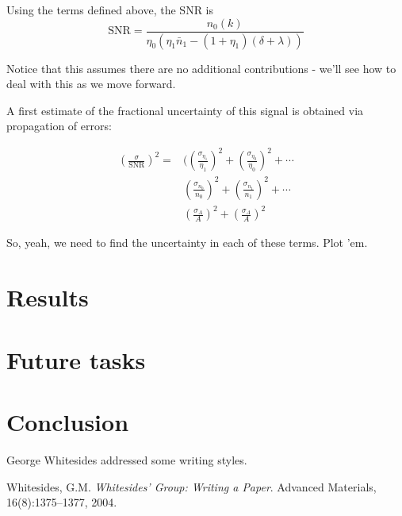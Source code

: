\documentclass[%
 reprint,
 amsmath,amssymb,
 aps,
]{revtex4-1}
\begin{document}
Using the terms defined above, the SNR is
\begin{equation}
    \textrm{SNR} = \frac{n_0(k)}{\eta_0\left(\eta_1\bar{n}_1 - (1+\eta_1)(\delta+\lambda)\right)}
\end{equation}

Notice that this assumes there are no additional contributions - we'll see how to deal with this as we move forward.

A first estimate of the fractional uncertainty of this signal is obtained via propagation of errors:

\begin{equation}
\begin{split}
    \left(\frac{\sigma}{\textrm{SNR}}\right)^2 =& (\left(\frac{\sigma_{\eta_1}}{\eta_1}\right)^2+\left(\frac{\sigma_{\eta_0}}{\eta_0}\right)^2+\cdots\\
                                &\left(\frac{\sigma_n_0}{n_0}\right)^2+\left(\frac{\sigma_n_1}{n_1}\right)^2+\cdots\\ 
                                &\left(\frac{\sigma_A}{A}\right)^2+\left(\frac{\sigma_A}{A}\right)^2
\end{split}
\end{equation}

So, yeah, we need to find the uncertainty in each of these terms. Plot 'em.



\section{\label{results}Results}

\section{\label{tasks}Future tasks}

\section{\label{conclusion}Conclusion}



George Whitesides addressed some writing styles.\cite{Whitesides2004}

\medskip

\begin{thebibliography}{9}
Whitesides, G.M.
\textit{Whitesides' Group: Writing a Paper}.
Advanced Materials, 16(8):1375--1377, 2004.
\end{thebibliography}
\end{document}
